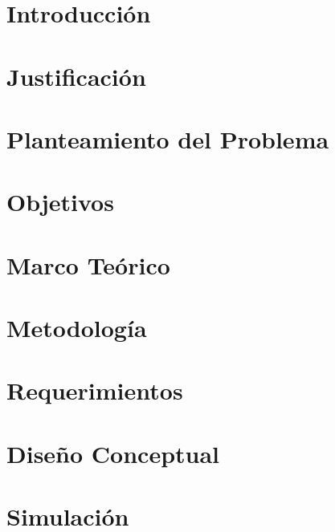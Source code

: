 \documentclass[10pt,spanish,fleqn,openany,twoside,letterpaper]{book}
\begin{document}


{\pagestyle{plain} 
\setlength{\parskip}{1mm}

%


}

{
\setlength{\parskip}{\baselineskip}
\chapter{Introducción}
    
\chapter{Justificación}
    
\chapter{Planteamiento del Problema}
    
\chapter{Objetivos}
    
\chapter{Marco Teórico}
    
\chapter{Metodología}
    
\chapter{Requerimientos}
    
\chapter{Diseño Conceptual}
    
\chapter{Simulación}
    
}
\end{document}

